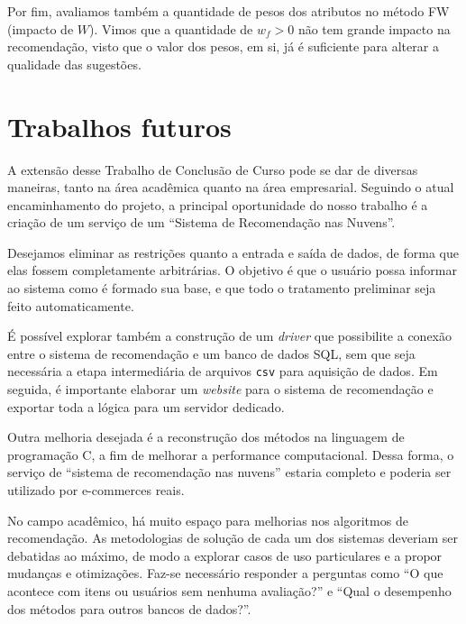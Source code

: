 Por fim, avaliamos também a quantidade de pesos dos atributos no método FW (impacto de $W$). Vimos que a quantidade de $w_f>0$ não tem grande impacto na recomendação, visto que o valor dos pesos, em si, já é suficiente para alterar a qualidade das sugestões.

\section{Trabalhos futuros} %
\label{sec:trabalhos_futuros}

A extensão desse Trabalho de Conclusão de Curso pode se dar de diversas maneiras, tanto na área acadêmica quanto na área empresarial. Seguindo o atual encaminhamento do projeto, a principal oportunidade do nosso trabalho é a criação de um serviço de um ``Sistema de Recomendação nas Nuvens''. 

Desejamos eliminar as restrições quanto a entrada e saída de dados, de forma que elas fossem completamente arbitrárias. O objetivo é que o usuário possa informar ao sistema como é formado sua base, e que todo o tratamento preliminar seja feito automaticamente. 

É possível explorar também a construção de um \textit{driver} que possibilite a conexão entre o sistema de recomendação e um banco de dados SQL, sem que seja necessária a etapa intermediária de arquivos \texttt{csv} para aquisição de dados. Em seguida, é importante elaborar um \textit{website} para o sistema de recomendação e exportar toda a lógica para um servidor dedicado. 

Outra melhoria desejada é a reconstrução dos métodos na linguagem de programação C, a fim de melhorar a performance computacional. Dessa forma, o serviço de ``sistema de recomendação nas nuvens'' estaria completo e poderia ser utilizado por e-commerces reais.

No campo acadêmico, há muito espaço para melhorias nos algoritmos de recomendação. As metodologias de solução de cada um dos sistemas deveriam ser debatidas ao máximo, de modo a explorar casos de uso particulares e a propor mudanças e otimizações. Faz-se necessário responder a perguntas como ``O que acontece com itens ou usuários sem nenhuma avaliação?'' e ``Qual o desempenho dos métodos para outros bancos de dados?''. 